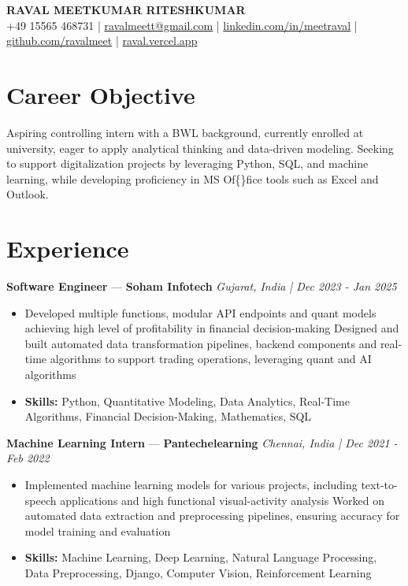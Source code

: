 \documentclass[a4paper,10pt]{article}
\begin{document}
\begin{center}
  {\Large\bfseries RAVAL MEETKUMAR RITESHKUMAR}\\[2pt]
  {\small +49 15565 468731 \;|\; \href{mailto:ravalmeett@gmail.com}{ravalmeett@gmail.com} \;|\; \href{https://www.linkedin.com/in/meetraval/}{linkedin.com/in/meetraval} \;|\; \href{https://github.com/ravalmeet}{github.com/ravalmeet} \;|\; \href{https://raval.vercel.app/}{raval.vercel.app}}
\end{center}
\vspace{-3pt}

\section*{Career Objective}
Aspiring controlling intern with a BWL background, currently enrolled at university, eager to apply analytical thinking and data-driven modeling. Seeking to support digitalization projects by leveraging Python, SQL, and machine learning, while developing proficiency in MS Of\{\}fice tools such as Excel and Outlook.\par

\section*{Experience}
\textbf{Software Engineer} — \textbf{Soham Infotech} \hfill \textit{Gujarat, India \;|\; Dec 2023 - Jan 2025}\par
\vspace{1pt}
\begin{itemize}
  \item Developed multiple functions, modular API endpoints and quant models achieving high level of profitability in financial decision-making Designed and built automated data transformation pipelines, backend components and real-time algorithms to support trading operations, leveraging quant and AI algorithms
  \item \textbf{Skills:} Python, Quantitative Modeling, Data Analytics, Real-Time Algorithms, Financial Decision-Making, Mathematics, SQL
\end{itemize}
\vspace{3pt}
\textbf{Machine Learning Intern} — \textbf{Pantechelearning} \hfill \textit{Chennai, India \;|\; Dec 2021 - Feb 2022}\par
\vspace{1pt}
\begin{itemize}
  \item Implemented machine learning models for various projects, including text-to-speech applications and high functional visual-activity analysis Worked on automated data extraction and preprocessing pipelines, ensuring accuracy for model training and evaluation
  \item \textbf{Skills:} Machine Learning, Deep Learning, Natural Language Processing, Data Preprocessing, Django, Computer Vision, Reinforcement Learning
\end{itemize}
\end{document}
